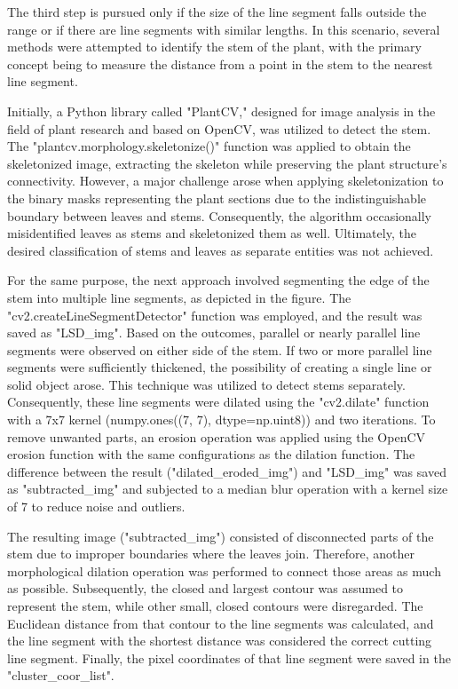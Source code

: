 \documentclass[]{iat}
\begin{document}
\par
The third step is pursued only if the size of the line segment falls outside the range or if there are line segments with similar lengths. In this scenario, several methods were attempted to identify the stem of the plant, with the primary concept being to measure the distance from a point in the stem to the nearest line segment.
\par
Initially, a Python library called "PlantCV," designed for image analysis in the field of plant research and based on OpenCV, was utilized to detect the stem. The "plantcv.morphology.skeletonize()" function was applied to obtain the skeletonized image, extracting the skeleton while preserving the plant structure's connectivity. However, a major challenge arose when applying skeletonization to the binary masks representing the plant sections due to the indistinguishable boundary between leaves and stems. Consequently, the algorithm occasionally misidentified leaves as stems and skeletonized them as well. Ultimately, the desired classification of stems and leaves as separate entities was not achieved.
\par
For the same purpose, the next approach involved segmenting the edge of the stem into multiple line segments, as depicted in the figure. The "cv2.createLineSegmentDetector" function was employed, and the result was saved as "LSD\_img". Based on the outcomes, parallel or nearly parallel line segments were observed on either side of the stem. If two or more parallel line segments were sufficiently thickened, the possibility of creating a single line or solid object arose. This technique was utilized to detect stems separately. Consequently, these line segments were dilated using the "cv2.dilate" function with a 7x7 kernel (numpy.ones((7, 7), dtype=np.uint8)) and two iterations. To remove unwanted parts, an erosion operation was applied using the OpenCV erosion function with the same configurations as the dilation function. The difference between the result ("dilated\_eroded\_img") and "LSD\_img" was saved as "subtracted\_img" and subjected to a median blur operation with a kernel size of 7 to reduce noise and outliers.
\par
The resulting image ("subtracted\_img") consisted of disconnected parts of the stem due to improper boundaries where the leaves join. Therefore, another morphological dilation operation was performed to connect those areas as much as possible. Subsequently, the closed and largest contour was assumed to represent the stem, while other small, closed contours were disregarded. The Euclidean distance from that contour to the line segments was calculated, and the line segment with the shortest distance was considered the correct cutting line segment. Finally, the pixel coordinates of that line segment were saved in the "cluster\_coor\_list".
\par
\end{document}
